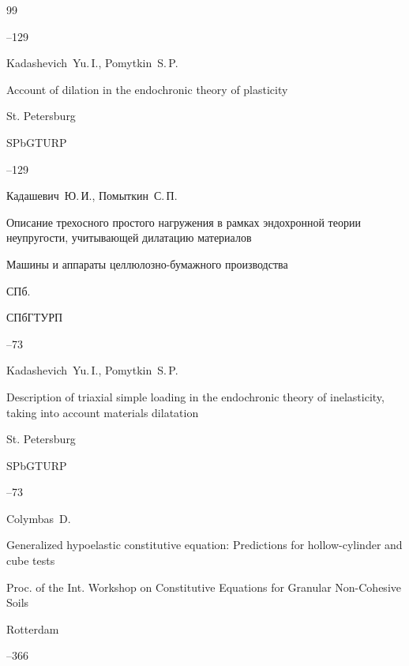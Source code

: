 \begin{thebibliography}{99}

--129

\misctransl

\by Kadashevich~Yu.\,I., Pomytkin~S.\,P.

\paper Account of dilation in the endochronic theory of plasticity

\publaddr St. Petersburg

\publ SPbGTURP 


--129










\by Кадашевич~Ю.\,И., Помыткин~С.\,П.

\paper Описание трехосного простого нагружения в рамках эндохронной теории неупругости, учитывающей дилатацию материалов

\inbook Машины и аппараты целлюлозно-бумажного производства

\publaddr СПб.

\publ СПбГТУРП


--73

\misctransl

\by Kadashevich~Yu.\,I., Pomytkin~S.\,P.

\paper Description of triaxial simple loading in the endochronic theory of inelasticity, taking into account materials dilatation 

\publaddr St. Petersburg

\publ SPbGTURP 


--73




\by Colymbas~D.

\paper Generalized hypoelastic constitutive equation: Predictions for hollow-cylinder and cube tests

\inbook Proc. of the Int. Workshop on Constitutive Equations for Granular Non-Cohesive Soils

\publaddr Rotterdam


--366





\end{thebibliography}
